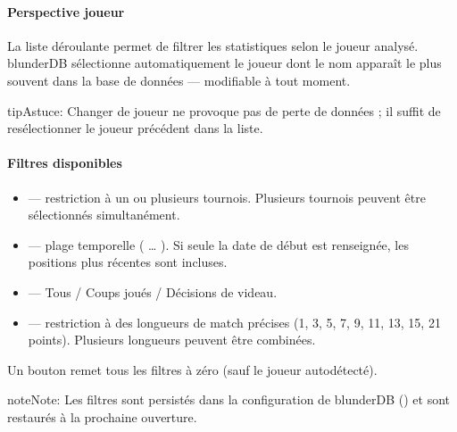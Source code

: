 \documentclass[letterpaper,10pt,french]{sphinxmanual}
\begin{document}
\paragraph{Perspective joueur}
\label{\detokenize{manuel:perspective-joueur}}
\sphinxAtStartPar
La liste déroulante  permet de filtrer les statistiques selon le
joueur analysé. blunderDB sélectionne automatiquement le joueur dont le nom
apparaît le plus souvent dans la base de données — modifiable à tout moment.

\begin{sphinxadmonition}{tip}{Astuce:}
\sphinxAtStartPar
Changer de joueur ne provoque pas de perte de données ; il suffit de
re\sphinxhyphen{}sélectionner le joueur précédent dans la liste.
\end{sphinxadmonition}


\paragraph{Filtres disponibles}
\label{\detokenize{manuel:filtres-disponibles}}\begin{itemize}
\item {} 
\sphinxAtStartPar
{} — restriction à un ou plusieurs tournois. Plusieurs tournois
peuvent être sélectionnés simultanément.

\item {} 
\sphinxAtStartPar
{} — plage temporelle ( … ). Si seule la date de début est
renseignée, les positions plus récentes sont incluses.

\item {} 
\sphinxAtStartPar
{} — Tous / Coups joués / Décisions de videau.

\item {} 
\sphinxAtStartPar
{} — restriction à des longueurs de match précises (1, 3,
5, 7, 9, 11, 13, 15, 21 points). Plusieurs longueurs peuvent être combinées.

\end{itemize}

\sphinxAtStartPar
Un bouton  remet tous les filtres à zéro (sauf le joueur
auto\sphinxhyphen{}détecté).

\begin{sphinxadmonition}{note}{Note:}
\sphinxAtStartPar
Les filtres sont persistés dans la configuration de blunderDB
() et sont restaurés à la prochaine ouverture.
\end{sphinxadmonition}
\end{document}
